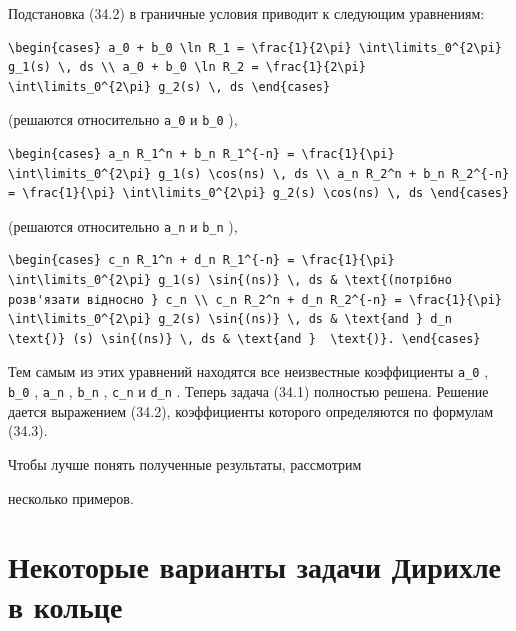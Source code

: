 \documentclass[
  ukrainian,
]{article}
\begin{document}
Подстановка (34.2) в граничные условия приводит к следующим уравнениям:

\begin{verbatim}
\begin{cases} a_0 + b_0 \ln R_1 = \frac{1}{2\pi} \int\limits_0^{2\pi} g_1(s) \, ds \\ a_0 + b_0 \ln R_2 = \frac{1}{2\pi} \int\limits_0^{2\pi} g_2(s) \, ds \end{cases}
\end{verbatim}

(решаются относительно \texttt{a\_0} и \texttt{b\_0} ),

\begin{verbatim}
\begin{cases} a_n R_1^n + b_n R_1^{-n} = \frac{1}{\pi} \int\limits_0^{2\pi} g_1(s) \cos(ns) \, ds \\ a_n R_2^n + b_n R_2^{-n} = \frac{1}{\pi} \int\limits_0^{2\pi} g_2(s) \cos(ns) \, ds \end{cases}
\end{verbatim}

(решаются относительно \texttt{a\_n} и \texttt{b\_n} ),

\begin{verbatim}
\begin{cases} c_n R_1^n + d_n R_1^{-n} = \frac{1}{\pi} \int\limits_0^{2\pi} g_1(s) \sin{(ns)} \, ds & \text{(потрібно розв'язати відносно } c_n \\ c_n R_2^n + d_n R_2^{-n} = \frac{1}{\pi} \int\limits_0^{2\pi} g_2(s) \sin{(ns)} \, ds & \text{and } d_n \text{)} (s) \sin{(ns)} \, ds & \text{and }  \text{)}. \end{cases}
\end{verbatim}

Тем самым из этих уравнений находятся все неизвестные коэффициенты
\texttt{a\_0} , \texttt{b\_0} , \texttt{a\_n} , \texttt{b\_n} ,
\texttt{c\_n} и \texttt{d\_n} . Теперь задача (34.1) полностью решена.
Решение дается выражением (34.2), коэффициенты которого определяются по
формулам (34.3).

Чтобы лучше понять полученные результаты, рассмотрим

несколько примеров.

\section{Некоторые варианты задачи Дирихле в
кольце}\label{ux43dux435ux43aux43eux442ux43eux440ux44bux435-ux432ux430ux440ux438ux430ux43dux442ux44b-ux437ux430ux434ux430ux447ux438-ux434ux438ux440ux438ux445ux43bux435-ux432-ux43aux43eux43bux44cux446ux435}
\end{document}
